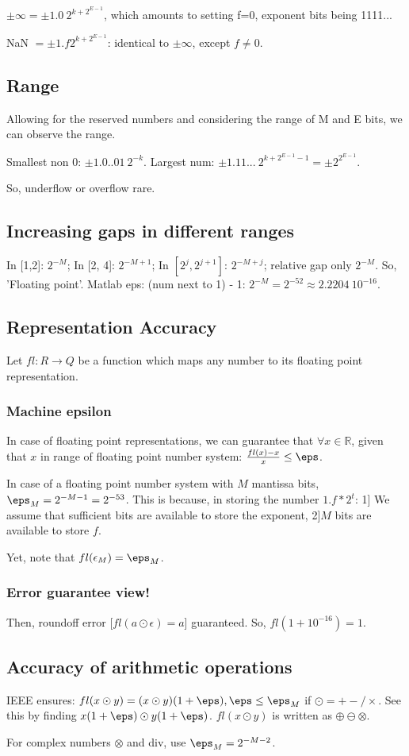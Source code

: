\documentclass[oneside, article]{memoir}
\begin{document}
$\pm \infty = \pm 1.0\ 2^{k+2^{E-1}}$, which amounts to setting f=0, exponent bits being 1111...

NaN $= \pm 1.f 2^{k+2^{E-1}}$: identical to $\pm \infty$, except $f \neq 0$.

\subsection{Range}
Allowing for the reserved numbers and considering the range of M and E bits, we can observe the range.

Smallest non 0: $\pm 1.0..01\ 2^{-k}$. Largest num: $\pm 1.11...\ 2^{k+2^{E-1}-1} = \pm 2^{2^{E-1}}$.

So, underflow or overflow rare.

\subsection{Increasing gaps in different ranges}
In [1,2]: $2^{-M}$; In [2, 4]: $2^{-M+1}$; In $[2^{j}, 2^{j+1}]$: $2^{-M+j}$; relative gap only $2^{-M}$. So, 'Floating point'. Matlab eps: (num next to 1) - 1: $2^{-M} = 2^{-52} \approx  2.2204\ 10^{-16}$.

\subsection{Representation Accuracy}
Let $fl:R \to Q$ be a function which maps any number to its floating point representation.

\subsubsection{Machine epsilon}
In case of floating point representations, we can guarantee that $\forall x \in \mathbb{R}$, given that $x$ in range of floating point number system: $\frac{fl(x) - x}{x} \leq \eps$.

In case of a floating point number system with $M$ mantissa bits, $\eps_{M} = 2^{-M -1} = 2^{-53}$. This is because, in storing the number $1.f * 2^t$: 1] We assume that sufficient bits are available to store the exponent, 2]$M$ bits are available to store $f$.

Yet, note that $fl(\epsilon_M) = \eps_M$.

\subsubsection{Error guarantee view!}
Then, roundoff error [$fl(a \odot \epsilon) = a$] guaranteed. So, $fl(1+10^{-16}) = 1$. 

\subsection{Accuracy of arithmetic operations}
IEEE ensures: $fl(x \odot y) = (x \odot y)(1+\eps), \eps \leq \eps_{M}$ if $\odot = +-/\times$. See this by finding $x(1 + \eps) \odot y(1 + \eps)$. $fl(x \odot y)$ is written as $\oplus \ominus \otimes$.

For complex numbers $\otimes$ and div, use $\eps_{M} = 2^{-M-2}$.


% 
% 
\end{document}

